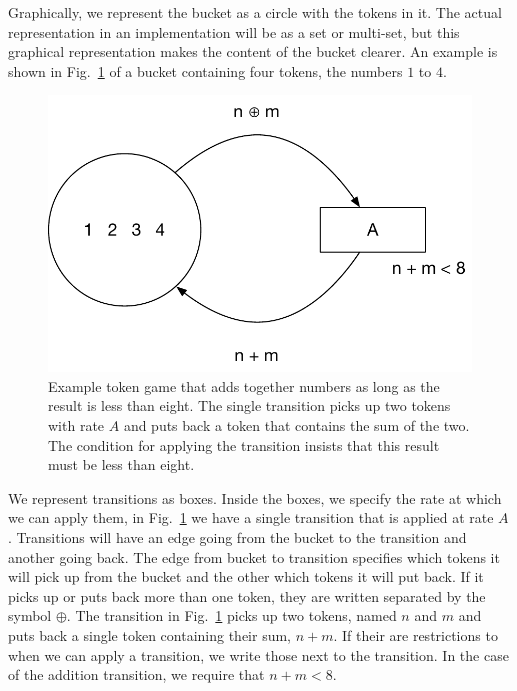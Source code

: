 \documentclass[graybox]{svmult}
\begin{document}
Graphically, we represent the bucket as a circle with the tokens in it. The actual representation in an implementation will be as a set or multi-set, but this graphical representation makes the content of the bucket clearer. An example is shown in Fig.~\ref{fig:example-CPN} of a bucket containing four tokens, the numbers $1$ to $4$.

\begin{figure}[h]
\sidecaption[t]
\includegraphics[scale=.45]{figures/example-CPN}
\caption{Example token game that adds together numbers as long as the result is less than eight. The single transition picks up two tokens with rate $A$ and puts back a token that contains the sum of the two. The condition for applying the transition insists that this result must be less than eight.}
\label{fig:example-CPN}
\end{figure}

We represent transitions as boxes. Inside the boxes, we specify the rate at which we can apply them, in Fig.~\ref{fig:example-CPN} we have a single transition that is applied at rate $A$. Transitions will have an edge going from the bucket to the transition and another going back. The edge from bucket to transition specifies which tokens it will pick up from the bucket and the other which tokens it will put back. If it picks up or puts back more than one token, they are written separated by the symbol $\oplus$. The transition in Fig.~\ref{fig:example-CPN} picks up two tokens, named $n$ and $m$ and puts back a single token containing their sum, $n+m$. If their are restrictions to when we can apply a transition, we write those next to the transition. In the case of the addition transition, we require that $n + m < 8$.
\end{document}
